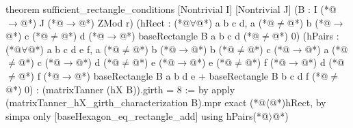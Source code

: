 theorem sufficient_rectangle_conditions [Nontrivial I] [Nontrivial J]
    (B : I (*@$\to$@*) J (*@$\to$@*) ZMod r)
    (hRect : (*@$\forall$@*) a b c d, a (*@$\ne$@*) b (*@$\to$@*) c (*@$\ne$@*) d (*@$\to$@*) baseRectangle B a b c d (*@$\ne$@*) 0)
    (hPairs : (*@$\forall$@*) a b c d e f, a (*@$\ne$@*) b (*@$\to$@*) b (*@$\ne$@*) c (*@$\to$@*) a (*@$\ne$@*) c (*@$\to$@*)
      d (*@$\ne$@*) e (*@$\to$@*) e (*@$\ne$@*) f (*@$\to$@*) d (*@$\ne$@*) f (*@$\to$@*)
      baseRectangle B a b d e + baseRectangle B b c d f (*@$\ne$@*) 0) :
    (matrixTanner (hX B)).girth = 8 := by
  apply (matrixTanner_hX_girth_characterization B).mpr
  exact (*@$\langle$@*)hRect, by simpa only [baseHexagon_eq_rectangle_add] using hPairs(*@$\rangle$@*)
